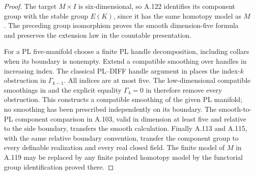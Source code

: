 \begin{proof}
The target $M\times I$ is six-dimensional, so A.122 identifies
its component group with the stable group $E(K)$, since it
has the same homotopy model as $M$. The preceding group
isomorphism proves the smooth dimension-five formula and
preserves the extension law in the countable presentation.

For a PL five-manifold choose a finite PL handle decomposition,
including collars when its boundary is nonempty. Extend a
compatible smoothing over handles in increasing index.
The classical PL--DIFF handle argument in
\cite[Essay~IV, Appendix~B, p.~211]{KirbySiebenmann1977}
places the index-$k$ obstruction in $\Gamma_{k-1}$.
All indices are at most five. The low-dimensional compatible
smoothings in \cite[Essay~I, p.~39]{KirbySiebenmann1977}
and the explicit equality $\Gamma_4=0$ in
\cite[Essay~IV, p.~200]{KirbySiebenmann1977}
therefore remove every obstruction. This constructs a
compatible smoothing of the given PL manifold; no smoothing
has been prescribed independently on its boundary.
The smooth-to-PL component comparison in A.103, valid in
dimension at least five and relative to the side boundary,
transfers the smooth calculation. Finally A.113 and A.115,
with the same relative boundary convention, transfer the
component group to every definable realization and every
real closed field. The finite model of $M$ in A.119 may be
replaced by any finite pointed homotopy model by the
functorial group identification proved there.
\end{proof}
